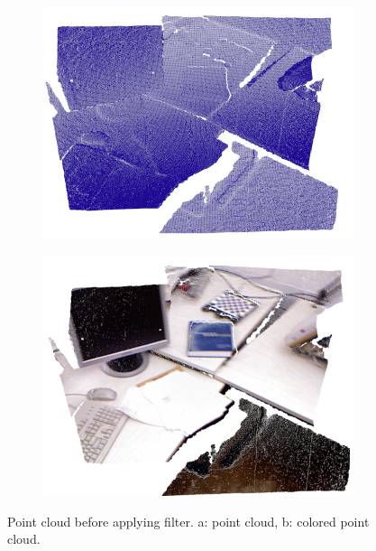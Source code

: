 \begin{figure}[H]
\begin{center}
\begin{subfigure}[b]{0.45\textwidth}
\includegraphics[scale=0.3]{images/borders_orig1.png}
\caption{}
\end{subfigure}
\begin{subfigure}[b]{0.45\textwidth}
\includegraphics[scale=0.3]{images/borders_orig2.png}
\caption{}
\end{subfigure}
\caption{Point cloud before applying filter. a: point cloud, b: colored point cloud.}
\end{center}
\end{figure}


